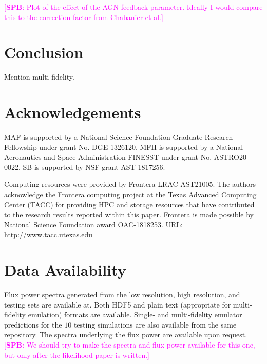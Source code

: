 \documentclass[a4paper,11pt]{article}
\newcommand{\spb}[1]{{\textcolor{magenta}{[{\bf SPB}: #1]}}}
\begin{document}
\spb{Plot of the effect of the AGN feedback parameter. Ideally I would compare this to the correction factor from Chabanier et al.}

\section{Conclusion}

Mention multi-fidelity.

\section*{Acknowledgements}
MAF is supported by a National Science Foundation Graduate Research Fellowship under grant No. DGE-1326120.
MFH is supported by a National Aeronautics and Space Administration FINESST under grant No. ASTRO20-0022.
SB is supported by NSF grant AST-1817256.

Computing resources were provided by Frontera LRAC AST21005.
The authors acknowledge the Frontera computing project at the Texas Advanced Computing Center (TACC) for providing HPC and storage resources that have contributed to the research results reported within this paper.
Frontera is made possible by National Science Foundation award OAC-1818253.
URL: \url{http://www.tacc.utexas.edu}

\section*{Data Availability}
Flux power spectra generated from the low resolution, high resolution, and testing sets are available at.
Both HDF5 and plain text (appropriate for multi-fidelity emulation) formats are available.
Single- and multi-fidelity emulator predictions for the $10$ testing simulations are also available from the same repository.
The spectra underlying the flux power are available upon request.
\spb{We should try to make the spectra and flux power available for this one, but only after the likelihood paper is written.}




\appendix

\label{lastpage}
\end{document}
